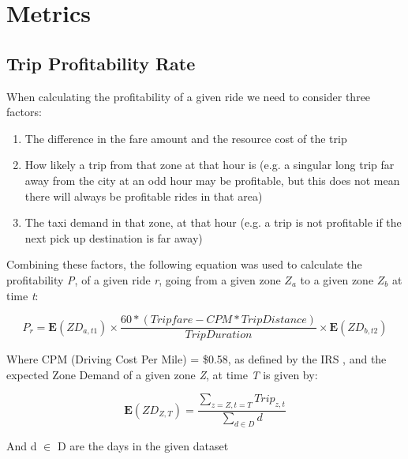 \documentclass[11pt]{article}
\begin{document}
\section{Metrics}

\subsection{Trip Profitability Rate}
When calculating the profitability of a given ride we need to consider three factors:
\begin{enumerate} 
    \item The difference in the fare amount and the resource cost of the trip
    \item How likely a trip from that zone at that hour is (e.g. a singular long trip far away from the city at an odd hour may be profitable, but this does not mean there will always be profitable rides in that area) 
    \item The taxi demand in that zone, at that hour (e.g. a trip is not profitable if the next pick up destination is far away)
\end{enumerate}

Combining these factors, the following equation was used to calculate the profitability \emph{P}, of a given ride \emph{r}, going from a given zone \emph{$Z_a$} to a given zone \emph{$Z_b$} at time \emph{t}:

\begin{equation}
    P_r = \mathbf{E}(ZD_{a,t1}) \times \frac{60 * (Trip fare - CPM * Trip Distance)}{Trip Duration} \times  \mathbf{E}(ZD_{b,t2})
\end{equation}

Where CPM (Driving Cost Per Mile) = \$0.58, as defined by the IRS \cite{IRS}, and the expected Zone Demand of a given zone \emph{Z}, at time \emph{T} is given by:

\begin{equation}
    \mathbf{E}(ZD_{Z,T}) = \frac{\sum_{z=Z, t=T}Trip_{z,t}}{\sum_{d \in D} d}
\end{equation}

And d $\in$ D are the days in the given dataset

\end{document}
